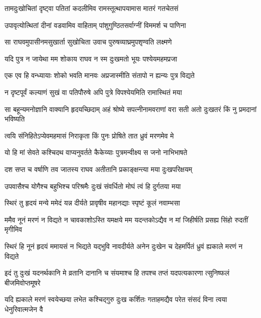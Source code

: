 \twolineshloka
{तामदुःखोचितां दृष्ट्वा पतितां कदलीमिव}
{रामस्तूत्थापयामास मातरं गतचेतसं} %

\twolineshloka
{उपावृत्योत्थितां दीनां वडवामिव वाहिताम्}
{पांशुगुण्ठितसर्वाग्नीं विममर्श च पाणिना} %

\twolineshloka
{सा राघवमुपासीनमसुखार्ता सुखोचिता}
{उवाच पुरुषव्याघ्रमुपशृण्वति लक्ष्मणे} %

\twolineshloka
{यदि पुत्र न जायेथा मम शोकाय राघव}
{न स्म दुःखमतो भूयः पश्येयमहमप्रजा} %

\twolineshloka
{एक एव हि वन्ध्यायाः शोको भवति मानवः}
{अप्रजास्मीति संतापो न ह्यन्यः पुत्र विद्यते} %

\twolineshloka
{न दृष्टपूर्वं कल्याणं सुखं वा पतिपौरुषे}
{अपि पुत्रे विपश्येयमिति रामास्थितं मया} %

\threelineshloka
{सा बहून्यमनोज्ञानि वाक्यानि हृदयच्छिदाम्}
{अहं श्रोष्ये सपत्नीनामवराणां वरा सती}
{अतो दुःखतरं किं नु प्रमदानां भविष्यति} %

\twolineshloka
{त्वयि संनिहितेऽप्येवमहमासं निराकृता}
{किं पुनः प्रोषिते तात ध्रुवं मरणमेव मे} %

\twolineshloka
{यो हि मां सेवते कश्चिदथ वाप्यनुवर्तते}
{कैकेय्याः पुत्रमन्वीक्ष्य स जनो नाभिभाषते} %

\twolineshloka
{दश सप्त च वर्षाणि तव जातस्य राघव}
{अतीतानि प्रकाङ्क्षन्त्या मया दुःखपरिक्षयम्} %

\twolineshloka
{उपवासैश्च योगैश्च बहुभिश्च परिश्रमैः}
{दुःखं संवर्धितो मोघं त्वं हि दुर्गतया मया} %

\twolineshloka
{स्थिरं तु हृदयं मन्ये ममेदं यन्न दीर्यते}
{प्रावृषीव महानद्याः स्पृष्टं कूलं नवाम्भसा} %

\fourlineindentedshloka
{ममैव नूनं मरणं न विद्यते}
{ न चावकाशोऽस्ति यमक्षये मम}
{यदन्तकोऽद्यैव न मां जिहीर्षति}
{ प्रसह्य सिंहो रुदतीं मृगीमिव} %

\fourlineindentedshloka
{स्थिरं हि नूनं हृदयं ममायसं}
{ न भिद्यते यद्भुवि नावदीर्यते}
{अनेन दुःखेन च देहमर्पितं}
{ ध्रुवं ह्यकाले मरणं न विद्यते} %

\fourlineindentedshloka
{इदं तु दुःखं यदनर्थकानि मे}
{ व्रतानि दानानि च संयमाश्च हि}
{तपश्च तप्तं यदपत्यकारणा}
{त्सुनिष्फलं बीजमिवोप्तमूषरे} %

\fourlineindentedshloka
{यदि ह्यकाले मरणं स्वयेच्छया}
{ लभेत कश्चिद्गुरु दुःख कर्शितः}
{गताहमद्यैव परेत संसदं}
{ विना त्वया धेनुरिवात्मजेन वै} %

